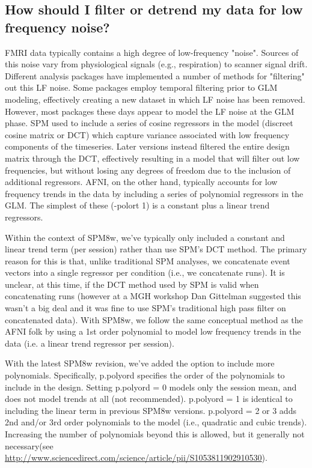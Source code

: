 \documentclass[12pt]{article}
\begin{document}
\subsection{How should I filter or detrend my data for low frequency noise?}
FMRI data typically contains a high degree of low-frequency "noise". Sources of this noise vary from physiological signals (e.g., respiration) to scanner signal drift. Different analysis packages have implemented a number of methods for "filtering" out this LF noise. Some packages employ temporal filtering prior to GLM modeling, effectively creating a new dataset in which LF noise has been removed. However, most packages these days appear to model the LF noise at the GLM phase. SPM used to include a series of cosine regressors in the model (discreet cosine matrix or DCT) which capture variance associated with low frequency components of the timeseries. Later versions instead filtered the entire design matrix through the DCT, effectively resulting in a model that will filter out low frequencies, but without losing any degrees of freedom due to the inclusion of additional regressors. AFNI, on the other hand, typically accounts for low frequency trends in the data by including a series of polynomial regressors in the GLM. The simplest of these (-polort 1) is a constant plus a linear trend regressors. 

Within the context of SPM8w, we've typically only included a constant and linear trend term (per session) rather than use SPM's DCT method. The primary reason for this is that, unlike traditional SPM analyses, we concatenate event vectors into a single regressor per condition (i.e., we concatenate runs). It is unclear, at this time, if the DCT method used by SPM is valid when concatenating runs (however at a MGH workshop Dan Gittelman suggested this wasn't a big deal and it was fine to use SPM's traditional high pass filter on concatenated data). With SPM8w, we follow the same conceptual method as the AFNI folk by using a 1st order polynomial to model low frequency trends in the data (i.e. a linear trend regressor per session).

With the latest SPM8w revision, we've added the option to include more polynomials. \newline Specifically, p.polyord specifies the order of the polynomials to include in the design. Setting p.polyord = 0 models only the session mean, and does not model trends at all (not recommended). p.polyord = 1 is identical to including the linear term in previous SPM8w versions. p.polyord = 2 or 3 adds 2nd and/or 3rd order polynomials to the model (i.e., quadratic and cubic trends). Increasing the number of polynomials beyond this is allowed, but it generally not necessary(see \url{http://www.sciencedirect.com/science/article/pii/S1053811902910530}). 
\end{document}
